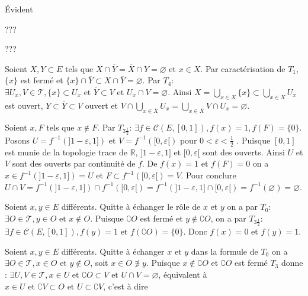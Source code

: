 \documentclass[a4paper, 11pt, french]{book}
\newenvironment{itemise}{\itemize}{\enditemize}
\theoremstyle{plain} %
\theoremstyle{definition} %
\theoremstyle{remark} %
\newcommand{\1}{\mathds{1}}
\newcommand\vide{\varnothing}
\newcommand{\cont}{\mathcal{C}}
\newcommand{\inv}[1]{#1^{-1}}
\newcommand\et{\text{ et }}
\newcommand{\R}{\mathbb{R}}
\begin{document}
\begin{itemise}
	\item[$T_5\Rightarrow T_4$ et $T_{2\frac{1}{2}}\Rightarrow T_2\Rightarrow T_1\Rightarrow T_0$:] Évident
	\item[$T_1+T_4\Rightarrow T_{3\frac{1}{2}}$:] {\color{green} ???}
	\item[$T_3+T_4\Rightarrow T_{3\frac{1}{2}}$:] {\color{green} ???}
{\color{red}
	\item[$T_1+T_4\Rightarrow T_5$:] Soient $X, Y\subset E$ tels que $X\cap\overline{Y}=\overline{X}\cap Y=\vide$ et $x\in X$.
	Par caractérisation de $T_1$, $\{x\}$ est fermé et $\{x\}\cap\overline{Y}\subset X\cap\overline{Y}=\vide$.
	Par $T_4$: $\exists U_x, V\in\mathscr{T}, \{x\}\subset U_x\et\overline{Y}\subset V\et U_x\cap V=\vide$.
	Ainsi $X=\bigcup_{x\in X}\{x\}\subset\bigcup_{x\in X}U_x$ est ouvert, $Y\subset\overline{Y}\subset V$ ouvert et $V\cap\bigcup_{x\in X}U_x=\bigcup_{x\in X}V\cap U_x=\vide$.
}
	\item[$T_{3\frac{1}{2}}\Rightarrow T_3$:] Soient $x, F$ tels que $x\notin F$.
	Par $T_{3\frac{1}{2}}$: $\exists f\in\cont(E, [0, 1]), f(x)=1, f(F)=\{0\}$.
	Posons $U=\inv{f}(]1-\varepsilon, 1])$ et $V=\inv{f}([0, \varepsilon[)$ pour $0<\varepsilon<\frac{1}{2}$ .
	Puisque $[0, 1]$ est munie de la topologie trace de $\R$, $]1-\varepsilon, 1]$ et $[0, \varepsilon[$ sont des ouverts.
	Ainsi $U$ et $V$ sont des ouverts par continuité de $f$.
	De $f(x)=1$ et $f(F)=0$ on a $x\in\inv{f}(]1-\varepsilon, 1])=U$ et $F\subset\inv{f}([0, \varepsilon[)=V$.
	Pour conclure $U\cap V=\inv{f}(]1-\varepsilon, 1])\cap\inv{f}([0, \varepsilon[)=\inv{f}(]1-\varepsilon, 1]\cap[0, \varepsilon[)=\inv{f}(\vide)=\vide$.
	\item[$T_0+T_{3\frac{1}{2}}\Rightarrow T_{2\frac{3}{4}}$:] Soient $x, y\in E$ différents.
	Quitte à échanger le rôle de $x$ et $y$ on a par $T_0$: $\exists O\in\mathscr{T}, y\in O\et x\notin O$.
	Puisque $\complement O$ est fermé et $y\notin\complement O$, on a par $T_{3\frac{1}{2}}$: $\exists f\in\cont(E, [0, 1]), f(y)=1\et f(\complement O)=\{0\}$.
	Donc $f(x)=0$ et $f(y)=1$.
	\item[$T_0+T_3\Rightarrow T_{2\frac{1}{2}}$:] Soient $x, y\in E$ différents.
	Quitte à échanger $x$ et $y$ dans la formule de $T_0$ on a $\exists O\in\mathscr{T}, x\in O\et y\notin O$, soit $x\in O\not\ni y$.
	Puisque $x\notin\complement O$ et $\complement O$ est fermé $T_3$ donne :
	$\exists U, V\in\mathscr{T}, x\in U\et\complement O\subset V\et U\cap V=\vide$, équivalent à
	$x\in U\et\complement V\subset O\et U\subset\complement V$, c'est à dire

\end{itemise}
\end{document}
